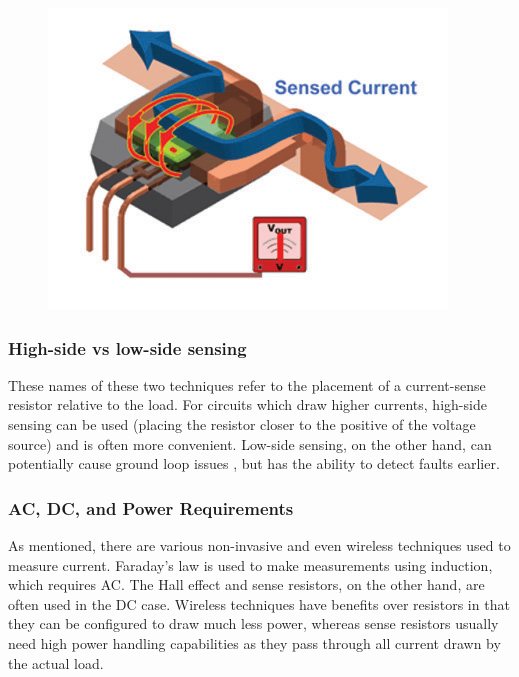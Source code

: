 \begin{figure}[h!]
    \centering
    \includegraphics[width=.3\linewidth]{Figures/hall-effect-cs}    
    \label{fig:hall-effect}
  \end{figure}

\subsubsection{High-side vs low-side sensing}\label{sec:cur_highlow}
These names of these two techniques refer to the placement of a current-sense resistor relative to the load. For circuits which draw higher currents, high-side sensing can be used
(placing the resistor closer to the positive of the voltage source) and is often more convenient. Low-side sensing, on the other hand, can potentially cause ground loop
issues \cite{WebsiteAllAboutCircuits}, but has the ability to detect faults earlier.

\subsubsection{AC, DC, and Power Requirements}\label{sec:cur_acdc}
As mentioned, there are various non-invasive and even wireless techniques used to measure current. Faraday's law is used to make measurements using induction, which requires AC.
The Hall effect and sense resistors, on the other hand, are often used in the DC case. Wireless techniques have benefits over resistors in that they can be configured to draw much less power,
whereas sense resistors usually need high power handling capabilities as they pass through all current drawn by the actual load.
